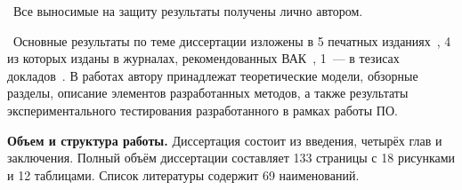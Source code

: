\contribution\ Все выносимые на защиту результаты получены лично автором.

\publications\ Основные результаты по теме диссертации изложены в 5 печатных изданиях~\cite{summary-impl-mine,summary-intro-mine,summary-inter-unit-mine,info-2015,bsb-paper-mine},
4 из которых изданы в журналах, рекомендованных ВАК~\cite{summary-impl-mine,summary-intro-mine,summary-inter-unit-mine}, 
1~--- в тезисах докладов~\cite{info-2015}. В работах \cite{summary-impl-mine,summary-intro-mine,summary-inter-unit-mine} автору принадлежат теоретические модели, обзорные разделы, описание элементов разработанных методов, а также результаты экспериментального тестирования разработанного в рамках работы ПО.

\textbf{Объем и структура работы.} Диссертация состоит из введения, четырёх глав и заключения. Полный объём диссертации составляет 133 страницы с 18 рисунками и 12 таблицами. Список литературы содержит 69 наименований.


